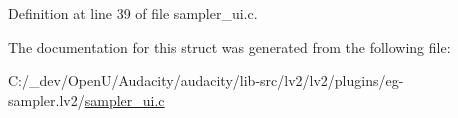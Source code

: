 Definition at line 39 of file sampler\+\_\+ui.\+c.



The documentation for this struct was generated from the following file\+:\begin{DoxyCompactItemize}
\item 
C\+:/\+\_\+dev/\+Open\+U/\+Audacity/audacity/lib-\/src/lv2/lv2/plugins/eg-\/sampler.\+lv2/\hyperlink{sampler__ui_8c}{sampler\+\_\+ui.\+c}\end{DoxyCompactItemize}
